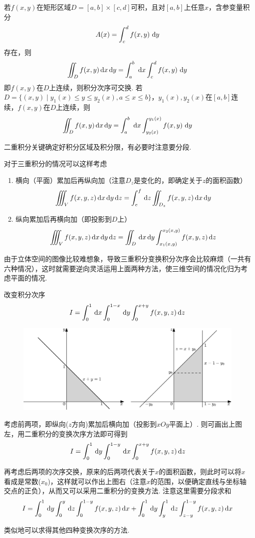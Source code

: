 \begin{theorem}
若$f(x,y)$在矩形区域$D=[a,b]\times[c,d]$可积，且对$[a,b]$上任意$x$，含参变量积分
\[A(x)=\displaystyle\int_{c}^{d}{f(x,y)}\,\,\mathrm{d} y\]
存在，则
\[\iint_Df(x,y)\,\mathrm{d} x\,\mathrm{d} y=\displaystyle\int_{a}^{b}{}\,\,\mathrm{d} x\displaystyle\int_{c}^{d}{f(x,y)}\,\,\mathrm{d} y\]
即$f(x,y)$在$D$上连续，则积分次序可交换.
若$D=\{(x,y)\mid y_1(x)\leq y\leq y_2(x),a\leq x\leq b\}$，$y_1(x),y_2(x)$在$[a,b]$连续，$f(x,y)$在$D$上连续，则
\[\iint_Df(x,y)\,\mathrm{d} x\,\mathrm{d} y=\displaystyle\int_{a}^{b}{}\,\,\mathrm{d} x\displaystyle\int_{y_2(x)}^{y_1(x)}{f(x,y)}\,\,\mathrm{d} y\]
\end{theorem}
\par 二重积分关键确定好积分区域及积分限，有必要时注意要分段.
\par 对于三重积分的情况可以这样考虑
\begin{enumerate}
	\item 横向（平面）累加后再纵向加（注意$D_z$是变化的，即确定关于$z$的面积函数）
	\[\iiint_Vf(x,y,z)\,\mathrm{d} x\,\mathrm{d} y\,\mathrm{d} z=\int_e^f\,\mathrm{d} z\iint_{D_z}f(x,y,z)\,\mathrm{d} x\,\mathrm{d} y\]
	\item 纵向累加后再横向加（即投影到$D$上）
	\[\iiint_Vf(x,y,z)\,\mathrm{d} x\,\mathrm{d} y\,\mathrm{d} z=\iint_D\,\mathrm{d} x\,\mathrm{d} y\int_{x_1(x,y)}^{x_2(x,y)}f(x,y,z)\,\mathrm{d} z\]
\end{enumerate}
\par 由于立体空间的图像比较难想象，导致三重积分变换积分次序会比较麻烦（一共有六种情况），这时就需要逆向灵活运用上面两种方法，使三维空间的情况化归为考虑平面的情况.
\begin{example}
改变积分次序
\[I=\int_0^1\,\mathrm{d} x\int_0^{1-x}\,\mathrm{d} y\int_0^{x+y}f(x,y,z)\,\mathrm{d} z\]
\end{example}
\begin{analysis}
\begin{figure}[H]
\centering
\includegraphics[width=0.6\linewidth]{fig/coordinate_eg.eps}
\end{figure}
考虑前两项，即纵向($z$方向)累加后横向加（投影到$xOy$平面上）.
则可画出上图左，用二重积分的变换次序方法即可得到
\[I=\int_0^1\,\mathrm{d} y\int_0^{1-y}\,\mathrm{d} x\int_0^{x+y}f(x,y,z)\,\mathrm{d} z\]
\par 再考虑后两项的次序交换，原来的后两项代表关于$x$的面积函数，则此时可以将$x$看成是常数($x_0$)，这样就可以作出上图右（注意$x$的范围，以便确定直线与坐标轴交点的正负），从而又可以采用二重积分的变换方法.
注意这里需要分段求和
\[I=\int_0^1\,\mathrm{d} y\int_0^y\,\mathrm{d} z\int_0^{1-y}f(x,y,z)\,\mathrm{d} x+\int_0^1\,\mathrm{d} y\int_y^1\,\mathrm{d} z\int_{z-y}^{1-y}f(x,y,z)\,\mathrm{d} x\]
\par 类似地可以求得其他四种变换次序的方法.
\end{analysis}
